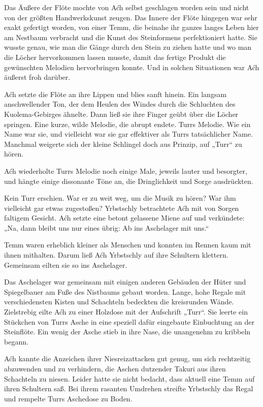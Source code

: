 Das Äußere der Flöte mochte von Aćh selbst geschlagen worden sein und nicht von der größten Handwerkskunst zeugen. Das Innere der Flöte hingegen war sehr exakt gefertigt worden, von einer Temm, die beinahe ihr ganzes langes Leben hier am Nestbaum verbracht und die Kunst des Steinformens perfektioniert hatte. Sie wusste genau, wie man die Gänge durch den Stein zu ziehen hatte und wo man die Löcher hervorkommen lassen musste, damit das fertige Produkt die gewünschten Melodien hervorbringen konnte. Und in solchen Situationen war Aćh äußerst froh darüber.

Aćh setzte die Flöte an ihre Lippen und blies sanft hinein. Ein langsam anschwellender Ton, der dem Heulen des Windes durch die Schluchten des Kuolema-Gebirges ähnelte. Dann ließ sie ihre Finger geübt über die Löcher springen. Eine kurze, wilde Melodie, die abrupt endete. Turrs Melodie. Wie ein Name war sie, und vielleicht war sie gar effektiver als Turrs tatsächlicher Name. Manchmal weigerte sich der kleine Schlingel doch aus Prinzip, auf „Turr“ zu hören.

Aćh wiederholte Turrs Melodie noch einige Male, jeweils lauter und besorgter, und hängte einige dissonante Töne an, die Dringlichkeit und Sorge ausdrückten.

Kein Turr erschien. War er zu weit weg, um die Musik zu hören? War ihm vielleicht gar etwas zugestoßen? Yrbstschly betrachtete Aćh mit von Sorgen faltigem Gesicht. Aćh setzte eine betont gelassene Miene auf und verkündete: „Na, dann bleibt uns nur eines übrig: Ab ins Aschelager mit uns.“

Temm waren erheblich kleiner als Menschen und konnten im Rennen kaum mit ihnen mithalten. Darum ließ Aćh Yrbstschly auf ihre Schultern klettern. Gemeinsam eilten sie so ins Aschelager.

Das Aschelager war gemeinsam mit einigen anderen Gebäuden der Hüter und Spiegelbauer am Fuße des Nistbaums gebaut worden. Lange, hohe Regale mit verschiedensten Kisten und Schachteln bedeckten die kreisrunden Wände. Zielstrebig eilte Aćh zu einer Holzdose mit der Aufschrift „Turr“. Sie leerte ein Stückchen von Turrs Asche in eine speziell dafür eingebaute Einbuchtung an der Steinflöte. Ein wenig der Asche stieb in ihre Nase, die unangenehm zu kribbeln begann.

Aćh kannte die Anzeichen ihrer Niesreizattacken gut genug, um sich rechtzeitig abzuwenden und zu verhindern, die Aschen dutzender Takuri aus ihren Schachteln zu niesen. Leider hatte sie nicht bedacht, dass aktuell eine Temm auf ihren Schultern saß. Bei ihrem rasanten Umdrehen streifte Yrbstschly das Regal und rempelte Turrs Aschedose zu Boden.

